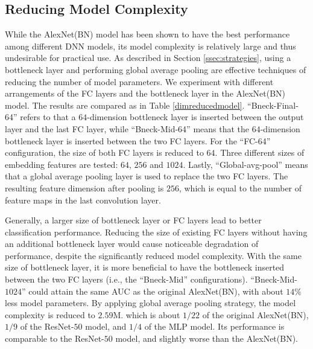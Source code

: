 \documentclass{article}
\begin{document}
\subsection{Reducing Model Complexity}
\label{ssec:lowdimfeature}

While the AlexNet(BN) model has been shown to have the best performance among different DNN models, its model complexity is relatively large and thus undesirable for practical use. As described in Section \ref{ssec:strategies}, using a bottleneck layer and performing global average pooling are effective techniques of reducing the number of model parameters. We experiment with different arrangements of the FC layers and the bottleneck layer in the AlexNet(BN) model. The results are compared as in Table \ref{dimreducedmodel}. ``Bneck-Final-64'' refers to that a $64$-dimension bottleneck layer is inserted between the output layer and the last FC layer, while ``Bneck-Mid-64'' means that the $64$-dimension bottleneck layer is inserted between the two FC layers. For the ``FC-64''  configuration, the size of both FC layers is reduced to $64$. Three different sizes of embedding features are tested: $64$, $256$ and $1024$. Lastly, ``Global-avg-pool'' means that a global average pooling layer is used to replace the two FC layers. The resulting feature dimension after pooling is $256$, which is equal to the number of feature maps in the last convolution layer.

Generally, a larger size of bottleneck layer or FC layers lead to better classification performance. Reducing the size of existing FC layers without having an additional bottleneck layer would cause noticeable degradation of performance, despite the significantly reduced model complexity. With the same size of bottleneck layer, it is more beneficial to have the bottleneck inserted between the two FC layers (i.e., the ``Bneck-Mid'' configurations). ``Bneck-Mid-$1024$'' could attain the same AUC as the original AlexNet(BN), with about $14\%$ less model parameters. By applying global average pooling strategy, the model complexity is reduced to $2.59$M. which is about $1/22$ of the original AlexNet(BN), $1/9$ of the ResNet-$50$ model, and $1/4$ of the MLP model. Its performance is comparable to the ResNet-$50$ model, and slightly worse than the AlexNet(BN).
\end{document}
